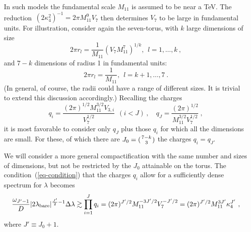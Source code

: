 \documentclass[12pt]{article}
\begin{document}
In such models the fundamental scale $M_{11} $ is assumed to be near a
TeV.  The reduction~$(2\kappa_4^2)^{-1} = 2\pi M_{11}^9 V_7$ then
determines $V_7$ to be large in fundamental units.  For illustration,
consider again the seven-torus, with $k$ large dimensions of size
\begin{equation}
2\pi r_l = \frac{1}{M_{11}} ( V_7 M_{11}^7 )^{1/k},~~
l=1, \ldots, k\ ,
\label{eq-large-dims}
\end{equation}
and $7-k$ dimensions of radius 1 in fundamental units:
\begin{equation}
2\pi r_l = \frac{1}{M_{11}},~~ l=k+1, \ldots, 7\ .
\label{eq-v3}
\end{equation}
(In general, of course, the radii could have a range of different
sizes.  It is trivial to extend this discussion accordingly.)
Recalling the charges
\begin{equation}
q_i = \frac{(2\pi)^{1/2} M_{11}^{3/2} V_{3,i}}{V_7^{1/2}}\ \ (i<J)\ ,
\quad  q_{J} =\frac{(2\pi)^{1/2} }{ M_{11}^{3/2} V_7^{1/2} }\ ,
\label{eq-qs}
\end{equation}
it is most favorable to consider only $q_J$ plus those $q_i$ for which
all the dimensions are small.  For these, of which there are $ J_{0} =
( { 7-k \atop 3 }) $ the charges $q_i = q_J$.

We will consider a more general compactification with the same number
and sizes of dimensions, but not be restricted by the $J_0$ attainable
on the torus.  The condition~(\ref{eq-condition}) that the charges
$q_i$ allow for a sufficiently dense spectrum for $\lambda$ becomes
\begin{equation}
\frac{\omega_{J'-1}}{D}|2\lambda_{\rm
bare}|^{\frac{J'}{2}-1}
\Delta\lambda
\gtrsim \prod_{i=1}^J q_i
= (2 \pi)^{J'/2} M_{11}^{-3J'/2} V_7^{-J'/2}
= (2 \pi)^{J'/2} M_{11}^{3J'} \kappa_4^{J'}
\ ,
\label{eq-condition-2}
\end{equation}
where $J' \equiv J_0+1$.
\end{document}
